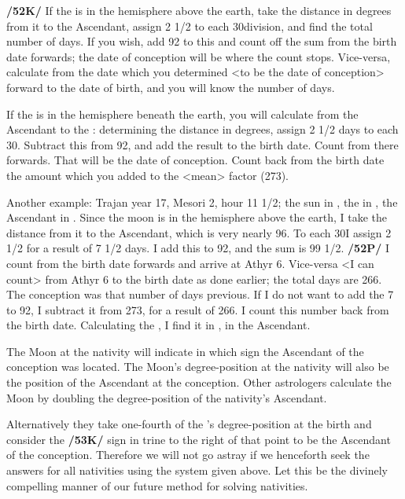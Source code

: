 \textbf{/52K/} If the \Moon\xspace is in the hemisphere above the earth, take the distance in degrees from it to the
Ascendant, assign 2 1/2 to each 30\deg division, and find the total number of days. If you wish, add 92 to this and count off the sum from the birth date forwards; the date of conception will be where the count stops. Vice-versa, calculate from the date which you determined <to be the date of conception> forward to the date of birth, and you will know the number of days. 

If the \Moon\xspace is in the hemisphere beneath the earth, you will calculate from the Ascendant to the \Moon: determining the distance in degrees, assign 2 1/2 days to each 30\deg. Subtract this from 92, and add the result to the birth date. Count from there forwards. That will be the date of conception. Count back from the birth date the amount which you added to the <mean> factor (273).

Another example: Trajan year 17, Mesori 2, hour 11 1/2; the sun in \Leo\xspace 5\deg, the \Moon\xspace in \Libra\xspace 26\deg, the Ascendant in \Capricorn\xspace 24\deg. Since the moon is in the hemisphere above the earth, I take the distance
from it to the Ascendant, which is very nearly 96\deg. To each 30\deg I assign 2 1/2 for a result of 7 1/2 days. I add this to 92, and the sum is 99 1/2. \textbf{/52P/} I count from the birth date forwards and arrive at Athyr 6. Vice-versa <I can count> from Athyr 6 to the birth date as done earlier; the total days are 266. The conception was that number of days previous. If I do not want to add the 7 to 92, I subtract it from 273, for a result of 266. I count this number back from the birth date. Calculating the \Moon, I find it in
\Capricorn, in the Ascendant.

The Moon at the nativity will indicate in which sign the Ascendant of the conception was located. The Moon’s degree-position at the nativity will also be the position of the Ascendant at the conception. Other astrologers calculate the Moon by doubling the degree-position of the nativity’s Ascendant.

Alternatively they take one-fourth of the \Sun’s degree-position at the birth and consider the \textbf{/53K/} sign in
trine to the right of that point to be the Ascendant of the conception. Therefore we will not go astray if we henceforth seek the answers for all nativities using the system given above. Let this be the divinely compelling manner of our future method for solving nativities.

\newpage
